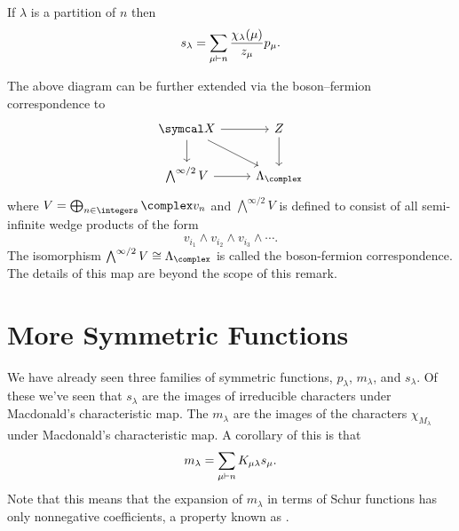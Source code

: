 \begin{crl}{}{}
    If \(\lambda\) is a partition of \(n\) then
    \begin{equation}
        s_\lambda = \sum_{\mu \vdash n} \frac{\chi_\lambda(\mu)}{z_\mu} p_\mu.
    \end{equation}
\end{crl}

\begin{remark}{}{}
    The above diagram can be further extended via the boson--fermion correspondence to
    \begin{equation}
        \begin{tikzcd}
            \classFunctions \arrow[r] \arrow[dr] \arrow[d] & Z \arrow[d]\\
            \bigwedge^{\infty/2} V \arrow[r] & \Lambda_{\complex}
        \end{tikzcd}
    \end{equation}
    where \(V = \bigoplus_{n \in \integers} \complex v_n\) and \(\bigwedge^{\infty/2}V\) is defined to consist of all semi-infinite wedge products of the form
    \begin{equation}
        v_{i_1} \wedge v_{i_2} \wedge v_{i_3} \wedge \dotsb.
    \end{equation}
    The isomorphism \(\bigwedge^{\infty/2}V \isomorphic \Lambda_{\complex}\) is called the boson-fermion correspondence.
    The details of this map are beyond the scope of this remark.
\end{remark}

\section{More Symmetric Functions}
We have already seen three families of symmetric functions, \(p_\lambda\), \(m_\lambda\), and \(s_\lambda\).
Of these we've seen that \(s_\lambda\) are the images of irreducible characters under Macdonald's characteristic map.
The \(m_\lambda\) are the images of the characters \(\chi_{M_\lambda}\) under Macdonald's characteristic map.
A corollary of this is that
\begin{equation}
    m_\lambda = \sum_{\mu \vdash n} K_{\mu\lambda} s_\mu.
\end{equation}
Note that this means that the expansion of \(m_\lambda\) in terms of Schur functions has only nonnegative coefficients, a property known as .


